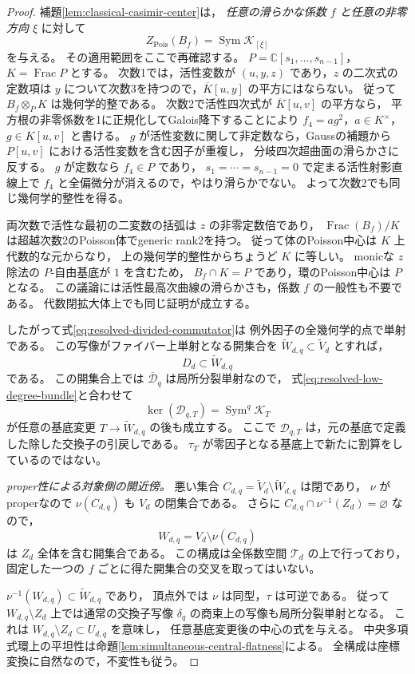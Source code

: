 \begin{proof}
補題\ref{lem:classical-casimir-center}は，
\emph{任意の滑らかな係数 $f$ と任意の非零方向 $\xi$} に対して
\[
 Z_{\mathrm{Pois}}(B_f)=\operatorname{Sym}\mathcal K_{[\xi]}
\]
を与える。
その適用範囲をここで再確認する。
$P=\mathbb C[s_1,\ldots,s_{n-1}]$，$K=\operatorname{Frac}P$ とする。
次数1では，活性変数が $(u,y,z)$ であり，$z$ の二次式の定数項は
$y$ について次数3を持つので，$\overline K[u,y]$ の平方にはならない。
従って $B_f\otimes_PK$ は幾何学的整である。
次数2で活性四次式が $\overline K[u,v]$ の平方なら，
平方根の非零係数を1に正規化してGalois降下することにより
$f_4=a g^2$，$a\in K^\times$，$g\in K[u,v]$ と書ける。
$g$ が活性変数に関して非定数なら，Gaussの補題から
$P[u,v]$ における活性変数を含む因子が重複し，
分岐四次超曲面の滑らかさに反する。
$g$ が定数なら $f_4\in P$ であり，
$s_1=\cdots=s_{n-1}=0$ で定まる活性射影直線上で
$f_4$ と全偏微分が消えるので，やはり滑らかでない。
よって次数2でも同じ幾何学的整性を得る。

両次数で活性な最初の二変数の括弧は $z$ の非零定数倍であり，
$\operatorname{Frac}(B_f)/K$ は超越次数2のPoisson体でgeneric rank2を持つ。
従って体のPoisson中心は $K$ 上代数的な元からなり，
上の幾何学的整性からちょうど $K$ に等しい。
monicな $z$ 除法の $P$-自由基底が $1$ を含むため，
$B_f\cap K=P$ であり，環のPoisson中心は $P$ となる。
この議論には活性最高次曲線の滑らかさも，係数 $f$ の一般性も不要である。
代数閉拡大体上でも同じ証明が成立する。

したがって式\eqref{eq:resolved-divided-commutator}は
例外因子の全幾何学的点で単射である。
この写像がファイバー上単射となる開集合を
$\widetilde W_{d,q}\subset\widetilde V_d$ とすれば，
\[
 D_d\subset\widetilde W_{d,q}
\]
である。
この開集合上では $\overline{\mathcal D}_q$ は局所分裂単射なので，
式\eqref{eq:resolved-low-degree-bundle}と合わせて
\[
 \ker(\mathcal D_{q,T})=\operatorname{Sym}^q\mathcal K_T
\]
が任意の基底変更 $T\to\widetilde W_{d,q}$ の後も成立する。
ここで $\mathcal D_{q,T}$ は，元の基底で定義した除した交換子の引戻しである。
$\tau_T$ が零因子となる基底上で新たに割算をしているのではない。

\emph{proper性による対象側の開近傍。}
悪い集合 $C_{d,q}=\widetilde V_d\setminus\widetilde W_{d,q}$ は閉であり，
$\nu$ がproperなので $\nu(C_{d,q})$ も $V_d$ の閉集合である。
さらに $C_{d,q}\cap\nu^{-1}(Z_d)=\varnothing$ なので，
\[
 W_{d,q}=V_d\setminus\nu(C_{d,q})
\]
は $Z_d$ 全体を含む開集合である。
この構成は全係数空間 $\mathcal T_d$ の上で行っており，
固定した一つの $f$ ごとに得た開集合の交叉を取ってはいない。

$\nu^{-1}(W_{d,q})\subset\widetilde W_{d,q}$ であり，
頂点外では $\nu$ は同型，$\tau$ は可逆である。
従って $W_{d,q}\setminus Z_d$ 上では通常の交換子写像
$\delta_q$ の商束上の写像も局所分裂単射となる。
これは $W_{d,q}\setminus Z_d\subset U_{d,q}$ を意味し，
任意基底変更後の中心の式を与える。
中央多項式環上の平坦性は命題\ref{lem:simultaneous-central-flatness}による。
全構成は座標変換に自然なので，不変性も従う。
\end{proof}


